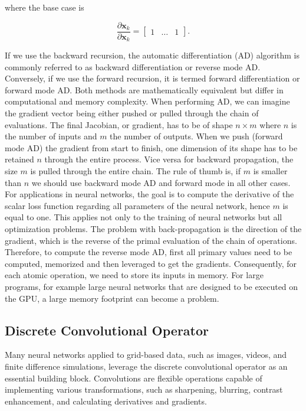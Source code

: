 \documentclass{article}
\begin{document}
where the base case is 

\begin{equation}
    \frac{\partial \mathbf{x}_{k}}{\partial \mathbf{x}_{k}} = \begin{bmatrix}
        1 & \dots & 1
    \end{bmatrix}.
\end{equation}

If we use the backward recursion, the automatic differentiation (AD) algorithm is commonly referred to as backward differentiation or reverse mode AD. Conversely, if we use the forward recursion, it is termed forward differentiation or forward mode AD. Both methods are mathematically equivalent but differ in computational and memory complexity. When performing AD, we can imagine the gradient vector being either pushed or pulled through the chain of evaluations. The final Jacobian, or gradient, has to be of shape $n \times m$ where $n$ is the number of inputs and $m$ the number of outputs. When we push (forward mode AD) the gradient from start to finish, one dimension of its shape has to be retained $n$ through the entire process. Vice versa for backward propagation, the size $m$ is pulled through the entire chain. The rule of thumb is, if $m$ is smaller than $n$ we should use backward mode AD and forward mode in all other cases. For applications in neural networks, the goal is to compute the derivative of the scalar loss function regarding all parameters of the neural network, hence $m$ is equal to one. This applies not only to the training of neural networks but all optimization problems. The problem with back-propagation is the direction of the gradient, which is the reverse of the primal evaluation of the chain of operations. Therefore, to compute the reverse mode AD, first all primary values need to be computed, memorized and then leveraged to get the gradients. Consequently, for each atomic operation, we need to store its inputs in memory. For large programs, for example large neural networks that are designed to be executed on the GPU, a large memory footprint can become a problem. 

\subsection{Discrete Convolutional Operator}

Many neural networks applied to grid-based data, such as images, videos, and finite difference simulations, leverage the discrete convolutional operator as an essential building block. Convolutions are flexible operations capable of implementing various transformations, such as sharpening, blurring, contrast enhancement, and calculating derivatives and gradients.
\end{document}
